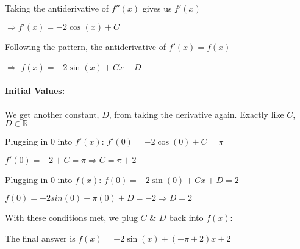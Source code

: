 \documentclass{article}
\begin{document}
Taking the antiderivative of $f''(x)$ gives us $f'(x)$\newline

$\Longrightarrow f'(x)=-2\cos(x) + C$\newline

Following the pattern, the antiderivative of $f'(x) = f(x)$\newline

$\Longrightarrow$ $f(x)=-2\sin(x)+Cx+D$\newline

\paragraph{Initial Values:}
We get another constant, $D$, from taking the derivative again. Exactly like $C$, $D\in\mathbb{R}$
\newline

Plugging in $0$ into $f'(x)$: $f'(0)=-2\cos(0)+C=\pi$\newline

$f'(0)=-2+C=\pi \Longrightarrow C=\pi+2$\newline

Plugging in $0$ into $f(x)$: $f(0)=-2\sin(0)+Cx+D=2$\newline

$f(0)=-2sin(0)-\pi(0)+D=-2 \Longrightarrow D=2$\newline

With these conditions met, we plug $C$ & $D$ back into $f(x)$:\newline

The final answer is $f(x)=-2\sin(x)+(-\pi+2)x+2$
\end{document}

